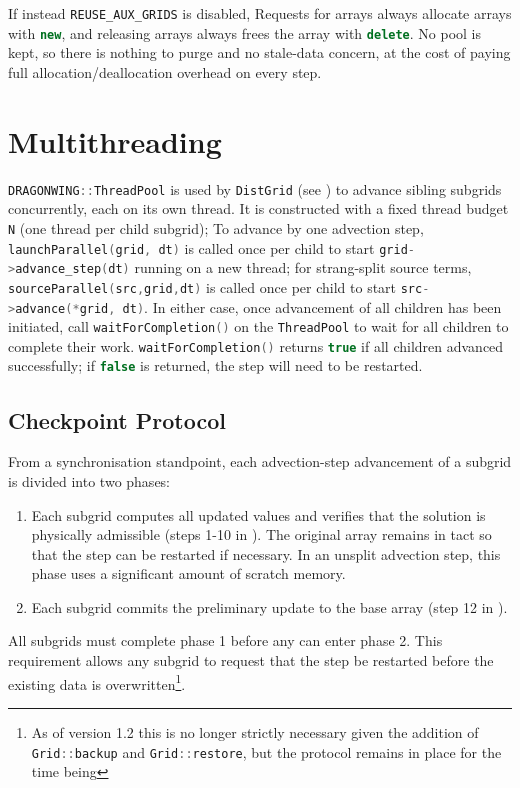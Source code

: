 \documentclass[11pt]{report}
\newcommand{\cpp}[1]{\lstinline[language=C++]{#1}}
\begin{document}
If instead \cpp{REUSE_AUX_GRIDS} is disabled, Requests for arrays always allocate arrays with \cpp{new}, and releasing arrays always frees the array with \cpp{delete}. No pool is kept, so there is nothing to purge and no stale-data concern, at the cost of paying full allocation/deallocation overhead on every step.







\section{Multithreading}
\label{sec:wing-threading}

\cpp{DRAGONWING::ThreadPool} is used by \cpp{DistGrid} (see ) to advance sibling subgrids concurrently, each on its own thread. It is constructed with a fixed thread budget \cpp{N} (one thread per child subgrid);
To advance by one advection step, \cpp{launchParallel(grid, dt)} is  called once per child to start \cpp{grid->advance_step(dt)} running on a new thread; for strang-split source terms, \cpp{sourceParallel(src,grid,dt)} is called  once per child to start \cpp{src->advance(*grid, dt)}.
In either case, once advancement of all children has been initiated, call  \cpp{waitForCompletion()} on the \cpp{ThreadPool} to wait for all children to complete their work.
\cpp{waitForCompletion()} returns \cpp{true} if all children advanced successfully; if \cpp{false} is returned, the step will need to be restarted.


\subsection{Checkpoint Protocol}

From a synchronisation standpoint, each advection-step  advancement of a subgrid is divided into two phases:
\begin{enumerate}
\item Each subgrid computes all updated values and verifies that the solution is physically admissible (steps 1-10 in ). The original array remains in tact so that the step can be restarted if necessary.  In an unsplit advection step, this phase uses a significant amount of scratch memory.  
\item Each subgrid commits the preliminary update to the base array (step 12 in ).
\end{enumerate}
All subgrids must complete phase 1 before any can enter phase 2. This requirement allows any subgrid to request that the step be restarted before the existing data is overwritten\footnote{As of version 1.2 this is no longer strictly necessary given the addition of \cpp{Grid::backup} and \cpp{Grid::restore}, but the protocol remains in place for the time being}.
\end{document}
